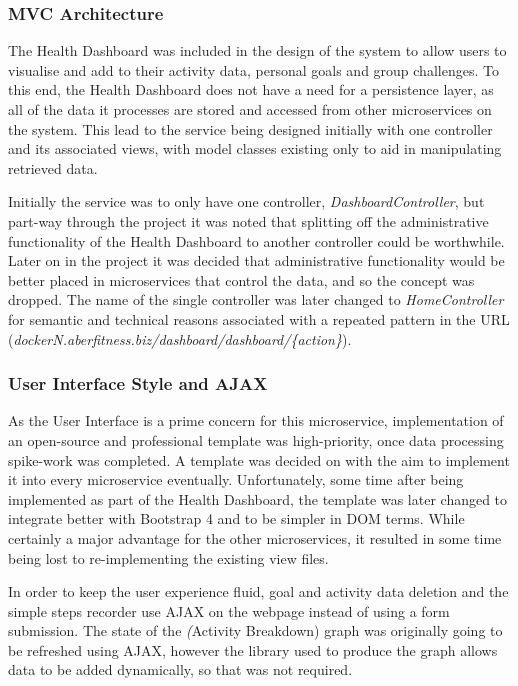 \subsubsection{MVC Architecture}
\par
The Health Dashboard was included in the design of the system to allow users to visualise and add to their activity data, personal goals and group challenges. To this end, the Health Dashboard does not have a need for a persistence layer, as all of the data it processes are stored and accessed from other microservices on the system. This lead to the service being designed initially with one controller and its associated views, with model classes existing only to aid in manipulating retrieved data.

\par
Initially the service was to only have one controller, \textit{DashboardController}, but part-way through the project it was noted that splitting off the administrative functionality of the Health Dashboard to another controller could be worthwhile. Later on in the project it was decided that administrative functionality would be better placed in microservices that control the data, and so the concept was dropped. The name of the single controller was later changed to \textit{HomeController} for semantic and technical reasons associated with a repeated pattern in the URL (\textit{dockerN.aberfitness.biz/dashboard/dashboard/\{action\}}).

\subsubsection{User Interface Style and AJAX}
\par
As the User Interface is a prime concern for this microservice, implementation of an open-source and professional template was high-priority, once data processing spike-work was completed. A template was decided on with the aim to implement it into every microservice eventually. Unfortunately, some time after being implemented as part of the Health Dashboard, the template was later changed to integrate better with Bootstrap 4 and to be simpler in DOM terms. While certainly a major advantage for the other microservices, it resulted in some time being lost to re-implementing the existing view files.

\par
In order to keep the user experience fluid, goal and activity data deletion and the simple steps recorder use AJAX on the webpage instead of using a form submission. The state of the \textit(Activity Breakdown) graph was originally going to be refreshed using AJAX, however the library used to produce the graph allows data to be added dynamically, so that was not required.

